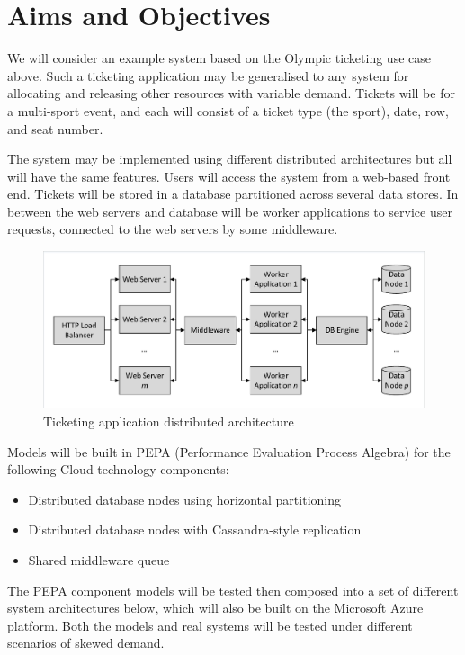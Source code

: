 \documentclass{llncs}
\begin{document}
\section{Aims and Objectives}

We will consider an example system based on the Olympic ticketing use case above.  Such a ticketing application may be generalised to any system for allocating and releasing other resources with variable demand.  Tickets will be for a multi-sport event, and each will consist of a ticket type (the sport), date, row, and seat number.

The system may be implemented using different distributed architectures but all will have the same features.  Users will access the system from a web-based front end.  Tickets will be stored in a database partitioned across several data stores.  In between the web servers and database will be worker applications to service user requests, connected to the web servers by some middleware.

\begin{figure}
	\caption{Ticketing application distributed architecture}
	\centering
	\includegraphics[trim = 5 5 5 5, clip, width=\textwidth]{img/application}
\end{figure}

Models will be built in PEPA (Performance Evaluation Process Algebra) \cite{RN1051} for the following Cloud technology components:

\begin{itemize}
\item Distributed database nodes using horizontal partitioning \cite{RN68}
\item Distributed database nodes with Cassandra-style replication \cite{RN1050}
\item Shared middleware queue \cite{RN65}
\end{itemize}

The PEPA component models will be tested then composed into a set of different system architectures below, which will also be built on the Microsoft Azure platform.  Both the models and real systems will be tested under different scenarios of skewed demand.
\end{document}
